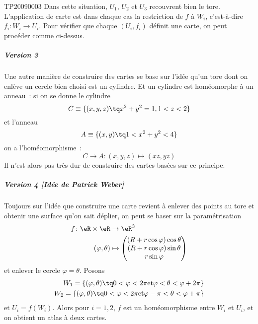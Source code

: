 \begin{corrige}{TP20090003}
Dans cette situation, $U_1$, $U_2$ et $U_3$ recouvrent bien le
tore. L'application de carte est dans chaque cas la restriction de $f$
à $W_i$, c'est-à-dire $f_i : W_i \to
U_i$. Pour vérifier que chaque $(U_i,f_i)$ définit une carte, on peut
procéder comme ci-dessus.

\subparagraph{Version 3}
Une autre manière de construire des cartes se base sur l'idée qu'un
tore dont on enlève un cercle bien choisi est un cylindre. Et un
cylindre est homéomorphe à un anneau~: si on se donne le cylindre
\begin{equation*}
  C \equiv \{ (x,y,z) \tq x^2 + y^2 = 1, 1 < z < 2 \}
\end{equation*}
et l'anneau
\begin{equation*}
  A \equiv \{ (x,y) \tq 1 < x^2 + y^2 < 4 \}
\end{equation*}
on a l'homéomorphisme~:
\begin{equation*}
  C \to A : (x,y,z) \mapsto (x z, y z)
\end{equation*}
Il n'est alors pas très dur de construire des cartes basées sur ce
principe.

\subparagraph{Version 4 [Idée de Patrick Weber]}
Toujours sur l'idée que construire une carte revient à enlever des
points au tore et obtenir une surface qu'on sait déplier, on peut se
baser sur la paramétrisation 
\begin{equation}
	\begin{aligned}
		f\colon \eR\times\eR&\to \eR^3 \\
		(\varphi,\theta)&\mapsto \begin{pmatrix}
			(R+r\cos\varphi)\cos\theta	\\ 
			(R+r\cos\varphi)\sin\theta	\\ 
			r\sin\varphi	
		\end{pmatrix}
	\end{aligned}
\end{equation}
et enlever le cercle $\varphi=\theta$. Posons
\begin{equation*}
  \begin{split}
    W_1 = \{ (\varphi,\theta) \tq 0 < \varphi < 2\pi \text{et}
    \varphi
    < \theta < \varphi + 2\pi \}\\
    W_2 = \{ (\varphi,\theta) \tq 0 < \varphi < 2\pi \text{et}
    \varphi - \pi < \theta < \varphi + \pi \}
  \end{split}
\end{equation*}
et $U_i = f(W_i)$. Alors pour $i = 1, 2$, $f$ est un homéomorphisme entre $W_i$ et
$U_i$, et on obtient un atlas à deux cartes.


\end{corrige}
